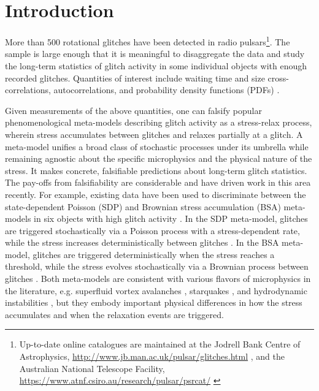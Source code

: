 \section{Introduction} \label{sec:hda_intro}

More than 500 rotational glitches have been detected in radio pulsars\footnote{Up-to-date online catalogues are maintained at the Jodrell Bank Centre of Astrophysics, \url{http://www.jb.man.ac.uk/pulsar/glitches.html} \citep{Espinoza2011}, and the Australian National Telescope Facility, \url{https://www.atnf.csiro.au/research/pulsar/psrcat/} \citep{Manchester2005}}. The sample is large enough that it is meaningful to disaggregate the data and study the long-term statistics of glitch activity in some individual objects with enough recorded glitches. Quantities of interest include waiting time and size cross-correlations, autocorrelations, and probability density functions (PDFs) \citep{Melatos2008, Espinoza2011, Melatos2018, Howitt2018, Fuentes2019, Carlin2019quasi, Carlin2019ac}.

Given measurements of the above quantities, one can falsify popular phenomenological meta-models describing glitch activity as a stress-relax process, wherein stress accumulates between glitches and relaxes partially at a glitch. A meta-model unifies a broad class of stochastic processes under its umbrella while remaining agnostic about the specific microphysics and the physical nature of the stress. It makes concrete, falsifiable predictions about long-term glitch statistics. The pay-offs from falsifiability are considerable and have driven work in this area recently. For example, existing data have been used to discriminate between the state-dependent Poisson (SDP) and Brownian stress accumulation (BSA) meta-models in six objects with high glitch activity \citep{Carlin2020bsa}. In the SDP meta-model, glitches are triggered stochastically via a Poisson process with a stress-dependent rate, while the stress increases deterministically between glitches \citep{Warszawski2013, Fulgenzi2017}. In the BSA meta-model, glitches are triggered deterministically when the stress reaches a threshold, while the stress evolves stochastically via a Brownian process between glitches \citep{Carlin2020bsa}. Both meta-models are consistent with various flavors of microphysics in the literature, e.g. superfluid vortex avalanches \citep{Anderson1975, Warszawski2011}, starquakes \citep{Larson2002, Middleditch2006}, and hydrodynamic instabilities \citep{Andersson2003, Mastrano2005, Glampedakis2009}, but they embody important physical differences in how the stress accumulates and when the relaxation events are triggered.

